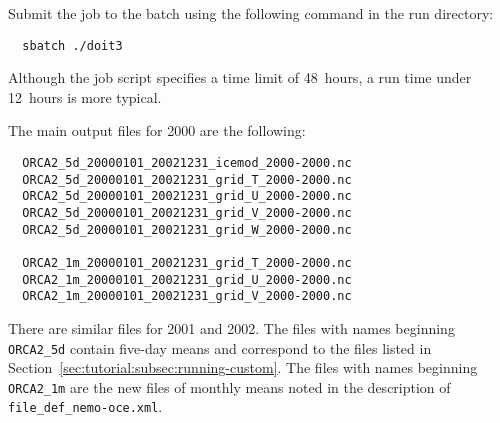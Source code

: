Submit the job to the batch using the following command in the run directory:

\begin{verbatim}
  sbatch ./doit3
\end{verbatim}

\noindent{}Although the job script specifies a time limit of 48~hours, a run time under 12~hours is more typical.

The main output files for 2000 are the following:

\begin{verbatim}
  ORCA2_5d_20000101_20021231_icemod_2000-2000.nc
  ORCA2_5d_20000101_20021231_grid_T_2000-2000.nc
  ORCA2_5d_20000101_20021231_grid_U_2000-2000.nc
  ORCA2_5d_20000101_20021231_grid_V_2000-2000.nc
  ORCA2_5d_20000101_20021231_grid_W_2000-2000.nc

  ORCA2_1m_20000101_20021231_grid_T_2000-2000.nc
  ORCA2_1m_20000101_20021231_grid_U_2000-2000.nc
  ORCA2_1m_20000101_20021231_grid_V_2000-2000.nc
\end{verbatim}

\noindent{}There are similar files for 2001 and 2002.
The files with names beginning \verb|ORCA2_5d| contain five-day means and correspond to the files listed in Section~\ref{sec:tutorial:subsec:running-custom}.
The files with names beginning \verb|ORCA2_1m| are the new files of monthly means noted in the description of \verb|file_def_nemo-oce.xml|.
